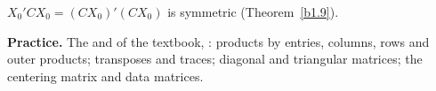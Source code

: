 \documentclass[12pt]{article}
\theoremstyle{definition}
\begin{document}
\(X_0'CX_0=(CX_0)'(CX_0)\) is symmetric (Theorem~\ref{b1.9}).

\bigskip
\textbf{Practice.} The  and  of the textbook, : products by entries, columns, rows and outer
products; transposes and traces; diagonal and triangular matrices; the centering matrix and data matrices.
\end{document}
